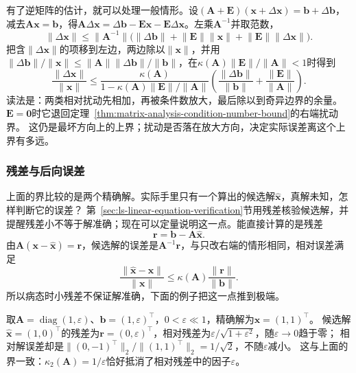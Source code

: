 有了逆矩阵的估计，就可以处理一般情形。设$(\bm A+\bm E)(\bm x+\Delta\bm x)=\bm b+\Delta\bm b$，减去$\bm A\bm x=\bm b$，得$\bm A\Delta\bm x=\Delta\bm b-\bm E\bm x-\bm E\Delta\bm x$。左乘$\bm A^{-1}$并取范数，
\[
 \lVert\Delta\bm x\rVert\leq\lVert\bm A^{-1}\rVert\bigl(\lVert\Delta\bm b\rVert+\lVert\bm E\rVert\lVert\bm x\rVert+\lVert\bm E\rVert\lVert\Delta\bm x\rVert\bigr).
\]
把含$\lVert\Delta\bm x\rVert$的项移到左边，两边除以$\lVert\bm x\rVert$，并用$\lVert\Delta\bm b\rVert/\lVert\bm x\rVert\leq\lVert\bm A\rVert\lVert\Delta\bm b\rVert/\lVert\bm b\rVert$，在$\kappa(\bm A)\lVert\bm E\rVert/\lVert\bm A\rVert<1$时得到
\begin{equation}
 \frac{\lVert\Delta\bm x\rVert}{\lVert\bm x\rVert}
 \leq
 \frac{\kappa(\bm A)}{1-\kappa(\bm A)\lVert\bm E\rVert/\lVert\bm A\rVert}
 \left(
 \frac{\lVert\Delta\bm b\rVert}{\lVert\bm b\rVert}
 +\frac{\lVert\bm E\rVert}{\lVert\bm A\rVert}
 \right).
 \label{eq:matrix-analysis-linear-system-perturbation}
\end{equation}
读法是：两类相对扰动先相加，再被条件数放大，最后除以到奇异边界的余量。
$\bm E=\bm0$时它退回定理~\ref{thm:matrix-analysis-condition-number-bound}的右端扰动界。
这仍是最坏方向上的上界；扰动是否落在放大方向，决定实际误差离这个上界有多远。

\subsubsection{残差与后向误差}
\label{sec:ls-numerical-stability}
\label{sec:ls-data-computation-error}
\label{sec:linear-algebra-error-propagation}
\label{sec:ch06-error-propagation}
\label{sec:ls-result-verification}
\label{sec:matrix-analysis-error-verification}

上面的界比较的是两个精确解。实际手里只有一个算出的候选解$\widehat{\bm x}$，真解未知，怎样判断它的误差？
第~\ref{sec:ls-linear-equation-verification}节用残差核验候选解，并提醒残差小不等于解准确；现在可以定量说明这一点。能直接计算的是残差
\begin{equation}
 \bm r=\bm b-\bm A\widehat{\bm x}.
 \label{eq:matrix-analysis-residual}
\end{equation}
由$\bm A(\bm x-\widehat{\bm x})=\bm r$，候选解的误差是$\bm A^{-1}\bm r$，与只改右端的情形相同，相对误差满足
\[
 \frac{\lVert\widehat{\bm x}-\bm x\rVert}{\lVert\bm x\rVert}
 \leq\kappa(\bm A)\frac{\lVert\bm r\rVert}{\lVert\bm b\rVert}.
\]
所以病态时小残差不保证解准确，下面的例子把这一点推到极端。

\begin{example}[反例：残差小而解误差大]
\label{ex:ls-small-residual-large-error}
取$\bm A=\operatorname{diag}(1,\varepsilon)$、$\bm b=(1,\varepsilon)^\top$，$0<\varepsilon\ll1$，精确解为$\bm x=(1,1)^\top$。
候选解$\widehat{\bm x}=(1,0)^\top$的残差为$\bm r=(0,\varepsilon)^\top$，相对残差为$\varepsilon/\sqrt{1+\varepsilon^2}$，随$\varepsilon\to0$趋于零；
相对解误差却是$\lVert(0,-1)^\top\rVert_2/\lVert(1,1)^\top\rVert_2=1/\sqrt2$，不随$\varepsilon$减小。
这与上面的界一致：$\kappa_2(\bm A)=1/\varepsilon$恰好抵消了相对残差中的因子$\varepsilon$。
\end{example}


